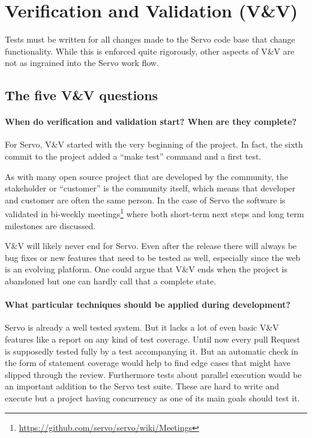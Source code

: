 \documentclass{scrartcl}
\begin{document}
\newpage


\section{Verification and Validation (V\&V)}

Tests must be written for all changes made to the Servo code base that change functionality. While this is enforced quite rigorously, other aspects of V\&V are not as ingrained into the Servo work flow.


\subsection{The five V\&V questions}

\paragraph{When do verification and validation start? When are they complete?}
For Servo, V\&V started with the very beginning of the project. In fact, the sixth commit to the project added a ``make test'' command and a first test.

As with many open source project that are developed by the community, the stakeholder or ``customer'' is the community itself, which means that developer and customer are often the same person. In the case of Servo the software is validated in bi-weekly meetings\footnote{\url{https://github.com/servo/servo/wiki/Meetings}} where both short-term next steps and long term milestones are discussed.

V\&V will likely never end for Servo. Even after the release there will always be bug fixes or new features that need to be tested as well, especially since the web is an evolving platform. One could argue that V\&V ends when the project is abandoned but one can hardly call that a complete state.

\paragraph{What particular techniques should be applied during development?}
Servo is already a well tested system. But it lacks a lot of even basic V\&V features like a report on any kind of test coverage. Until now every pull Request is supposedly tested fully by a test accompanying it. But an automatic check in the form of statement coverage would help to find edge cases that might have slipped through the review. Furthermore tests about parallel execution would be an important addition to the Servo test suite. These are hard to write and execute but a project having concurrency as one of its main goals should test it.
\end{document}
